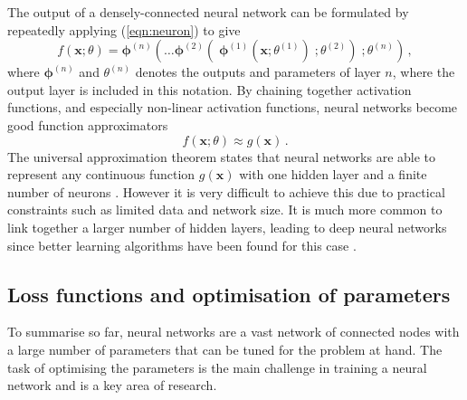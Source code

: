 \documentclass[main.tex]{subfiles}
\begin{document}
    The output of a densely-connected neural network can
    be formulated by repeatedly applying (\ref{eqn:neuron})
    to give
    \begin{equation}\label{eqn:nn_output}
        f(\mathbf{x}; \theta) = \boldsymbol{\phi}^{(n)}(\ldots \boldsymbol{\phi}^{(2)}(\; \boldsymbol{\phi}^{(1)}(\mathbf{x}; \theta^{(1)})\; ; \theta^{(2)}) \; ; \theta^{(n)}) \, ,
    \end{equation}
    where $\boldsymbol{\phi}^{(n)}$ and $\theta^{(n)}$
    denotes the outputs and parameters of layer $n$,
    where the output layer is included in this notation.
    By chaining together activation functions, and especially
    non-linear activation functions, neural networks
    become good function approximators
    \begin{equation}\label{eqn:nn_approx}
        f(\mathbf{x}; \theta) \approx g(\mathbf{x}) \, .
    \end{equation}
    The universal approximation theorem states that neural networks are
    able to represent any continuous function $g(\mathbf{x})$
    with one hidden layer and a finite number of neurons \cite{HORNIK1991251}.
    However it is very difficult to achieve this due to
    practical constraints such as limited data and network size.
    It is much more common to link
    together a larger number of hidden layers, leading
    to deep neural networks since better learning algorithms
    have been found for this case \cite{lu2017expressive}.
    
\subsection{Loss functions and optimisation of parameters}
    To summarise so far, neural networks are a vast network
    of connected nodes with a large number of parameters that
    can be tuned for the problem at hand.
    The task of optimising the parameters is the main challenge
    in training a neural network and is a key area of research.
\end{document}
